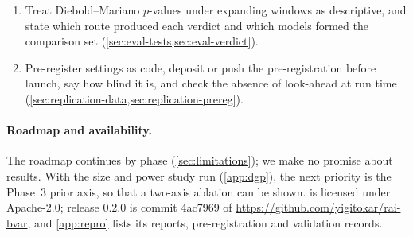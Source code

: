 \begin{enumerate}[leftmargin=*,itemsep=2pt,topsep=4pt]
    target's own scoring rule, or on both, and with an allowance for the uncertainty of the
    estimates they compare.
  \item Treat Diebold--Mariano $p$-values under expanding windows as descriptive, and state which
    route produced each verdict and which models formed the comparison set (\cref{sec:eval-tests,sec:eval-verdict}).
  \item Pre-register settings as code, deposit or push the pre-registration before launch, say how
    blind it is, and check the absence of look-ahead at run time
    (\cref{sec:replication-data,sec:replication-prereg}).
\end{enumerate}

\paragraph{Roadmap and availability.}
The roadmap continues by phase (\cref{sec:limitations}); we make no promise about results. %
With the size and power study run (\cref{app:dgp}), the next priority is the Phase~3 prior axis,
so that a two-axis ablation can be shown.  is licensed under
Apache-2.0; release 0.2.0 is commit 4ac7969 of \url{https://github.com/yigitokar/rai-bvar}, and
\cref{app:repro} lists its reports, pre-registration and validation records.
\label{sec:conclusion-end}%
